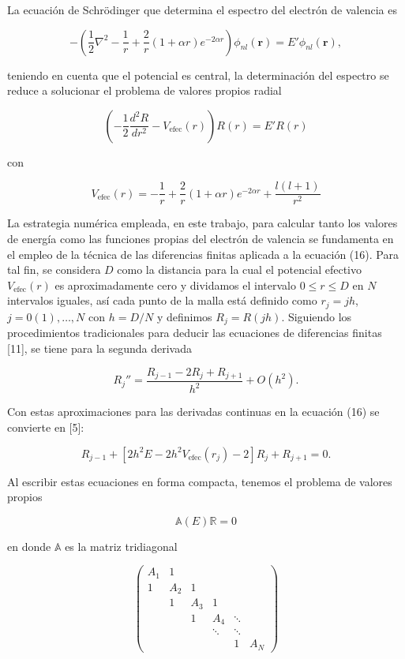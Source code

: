 \documentclass{article}
\begin{document}
La ecuación de Schrödinger que determina el espectro del electrón de valencia es

\[
-\left(\frac{1}{2}\nabla^2 - \frac{1}{r} + \frac{2}{r}(1 + \alpha r)e^{-2\alpha r}\right)\phi_{nl}(\mathbf{r}) = E'\phi_{nl}(\mathbf{r}), \tag{16}
\]

teniendo en cuenta que el potencial es central, la determinación del espectro se reduce a solucionar el problema de valores propios radial

\[
\left(-\frac{1}{2}\frac{d^2R}{dr^2} - V_{\text{efec}}(r)\right)R(r) = E'R(r) \tag{17}
\]

con

\[
V_{\text{efec}}(r) = -\frac{1}{r} + \frac{2}{r}(1 + \alpha r)e^{-2\alpha r} + \frac{l(l+1)}{r^2} \tag{18}
\]

La estrategia numérica empleada, en este trabajo, para calcular tanto los valores de energía como las funciones propias del electrón de valencia se fundamenta en el empleo de la técnica de las diferencias finitas aplicada a la ecuación (16). Para tal fin, se considera \( D \) como la distancia para la cual el potencial efectivo \( V_{\text{efec}}(r) \) es aproximadamente cero y dividamos el intervalo \( 0 \leq r \leq D \) en \( N \) intervalos iguales, así cada punto de la malla está definido como \( r_j = jh \), \( j = 0(1),\ldots,N \) con \( h = D/N \) y definimos \( R_j = R(jh) \). Siguiendo los procedimientos tradicionales para deducir las ecuaciones de diferencias finitas [11], se tiene para la segunda derivada

\[
R_j'' = \frac{R_{j-1} - 2R_j + R_{j+1}}{h^2} + O(h^2).
\]

Con estas aproximaciones para las derivadas continuas en la ecuación (16) se convierte en [5]:

\[
R_{j-1} + \left[2h^2E - 2h^2V_{\text{efec}}(r_j) - 2\right] R_j + R_{j+1} = 0.
\]

Al escribir estas ecuaciones en forma compacta, tenemos el problema de valores propios

\[
\mathbb{A}(E)\mathbb{R} = 0
\]

en donde \( \mathbb{A} \) es la matriz tridiagonal

\[
\begin{pmatrix}
A_1 & 1 \\
1 & A_2 & 1 \\
& 1 & A_3 & 1 \\
& & 1 & A_4 & \ddots \\
& & & \ddots & \ddots \\
& & & & 1 & A_N
\end{pmatrix}
\]
\end{document}
